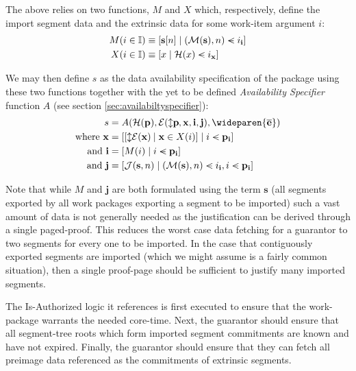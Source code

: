 The above relies on two functions, $M$ and $X$ which, respectively, define the import segment data and the extrinsic data for some work-item argument $i$:
\begin{equation}
  \begin{aligned}
    M(i \in \mathbb{I}) &\equiv [\mathbf{s}[n] \mid (\mathcal{M}(\mathbf{s}), n) \orderedin i_\mathbf{i}] \\
    X(i \in \mathbb{I}) &\equiv [x \mid \mathcal{H}(x) \orderedin i_\mathbf{x}]
  \end{aligned}
\end{equation}

We may then define $s$ as the data availability specification of the package using these two functions together with the yet to be defined \emph{Availability Specifier} function $A$ (see section \ref{sec:availabiltyspecifier}):
\begin{equation}
  \begin{aligned}
    s &= A(\mathcal{H}(\mathbf{p}), \se(\var{\mathbf{p}}, \mathbf{x}, \mathbf{i}, \mathbf{j}), \wideparen{\overline{\mathbf{e}}}) \\
    \nonumber \where \mathbf{x} &= [[\var{\se(\mathbf{x})} \mid \mathbf{x} \in X(i)] \mid i \orderedin \mathbf{p}_\mathbf{i}]\\
    \nonumber \also \mathbf{i} &= [M(i) \mid i \orderedin \mathbf{p}_\mathbf{i}]\\
    \nonumber \also \mathbf{j} &= [\mathcal{J}(\mathbf{s}, n) \mid (\mathcal{M}(\mathbf{s}), n) \orderedin i_\mathbf{i}, i \orderedin \mathbf{p}_\mathbf{i}]
  \end{aligned}
\end{equation}

Note that while $M$ and $\mathbf{j}$ are both formulated using the term $\mathbf{s}$ (all segments exported by all work packages exporting a segment to be imported) such a vast amount of data is not generally needed as the justification can be derived through a single paged-proof. This reduces the worst case data fetching for a guarantor to two segments for every one to be imported. In the case that contiguously exported segments are imported (which we might assume is a fairly common situation), then a single proof-page should be sufficient to justify many imported segments.

The Is-Authorized logic it references is first executed to ensure that the work-package warrants the needed core-time. Next, the guarantor should ensure that all segment-tree roots which form imported segment commitments are known and have not expired. Finally, the guarantor should ensure that they can fetch all preimage data referenced as the commitments of extrinsic segments.

